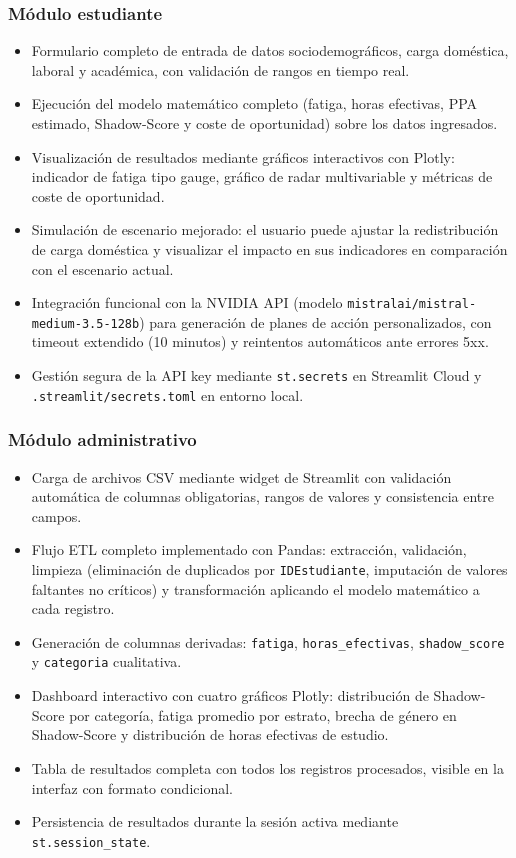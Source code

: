 \documentclass[12pt, spanish]{article}
\begin{document}
\subsubsection{Módulo estudiante}
\begin{itemize}
    \item Formulario completo de entrada de datos sociodemográficos, carga doméstica, laboral y académica, con validación de rangos en tiempo real.
    \item Ejecución del modelo matemático completo (fatiga, horas efectivas, PPA estimado, Shadow-Score y coste de oportunidad) sobre los datos ingresados.
    \item Visualización de resultados mediante gráficos interactivos con Plotly: indicador de fatiga tipo gauge, gráfico de radar multivariable y métricas de coste de oportunidad.
    \item Simulación de escenario mejorado: el usuario puede ajustar la redistribución de carga doméstica y visualizar el impacto en sus indicadores en comparación con el escenario actual.
    \item Integración funcional con la NVIDIA API (modelo \texttt{mistralai/mistral-medium-3.5-128b}) para generación de planes de acción personalizados, con timeout extendido (10 minutos) y reintentos automáticos ante errores 5xx.
    \item Gestión segura de la API key mediante \texttt{st.secrets} en Streamlit Cloud y \texttt{.streamlit/secrets.toml} en entorno local.
\end{itemize}

\subsubsection{Módulo administrativo}
\begin{itemize}
    \item Carga de archivos CSV mediante widget de Streamlit con validación automática de columnas obligatorias, rangos de valores y consistencia entre campos.
    \item Flujo ETL completo implementado con Pandas: extracción, validación, limpieza (eliminación de duplicados por \texttt{IDEstudiante}, imputación de valores faltantes no críticos) y transformación aplicando el modelo matemático a cada registro.
    \item Generación de columnas derivadas: \texttt{fatiga}, \texttt{horas\_efectivas}, \texttt{shadow\_score} y \texttt{categoria} cualitativa.
    \item Dashboard interactivo con cuatro gráficos Plotly: distribución de Shadow-Score por categoría, fatiga promedio por estrato, brecha de género en Shadow-Score y distribución de horas efectivas de estudio.
    \item Tabla de resultados completa con todos los registros procesados, visible en la interfaz con formato condicional.
    \item Persistencia de resultados durante la sesión activa mediante \texttt{st.session\_state}.
\end{itemize}
\end{document}
